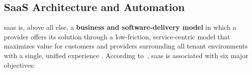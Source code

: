 \documentclass[11pt, a4paper, oneside, listof=totoc]{scrartcl}
\begin{document}
        \newpage

        \subsection{SaaS Architecture and Automation}\label{subsec:saas}
            \gls{saas} is, above all else, a \textbf{business and software-delivery model} in which
            a provider offers its solution through a low-friction, service-centric model that
            maximizes value for customers and providers surrounding all tenant environments with a
            single, unified experience
            \parencites[pp.~3--4]{awsSaaSArchitectureFundamentals}[p.~11]{awsSaaSArchitectureFundamentals}.
            According to~\cite[pp.~3-4]{awsSaaSArchitectureFundamentals}, \gls{saas} is associated
            with six major objectives:
\end{document}

